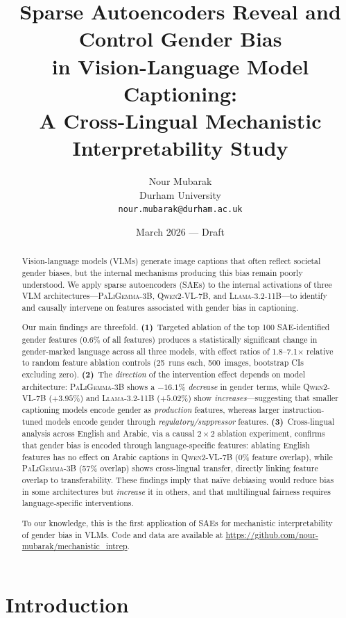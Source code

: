 \documentclass[11pt,a4paper]{article}
\title{Sparse Autoencoders Reveal and Control Gender Bias\\in Vision-Language Model Captioning:\\A Cross-Lingual Mechanistic Interpretability Study}
\author{
  Nour Mubarak \\
  Durham University \\
  \texttt{nour.mubarak@durham.ac.uk}
}
\date{March 2026 — Draft}
\newcommand{\modelname}[1]{\textsc{#1}}
\newcommand{\pali}{\modelname{PaLiGemma-3B}}
\newcommand{\qwen}{\modelname{Qwen2-VL-7B}}
\newcommand{\llama}{\modelname{Llama-3.2-11B}}
\newcommand{\sae}{SAE}
\newcommand{\saes}{SAEs}
\begin{document}
\maketitle

\begin{abstract}
Vision-language models (VLMs) generate image captions that often reflect societal gender biases, but the internal mechanisms producing this bias remain poorly understood.
We apply sparse autoencoders (\saes{}) to the internal activations of three VLM architectures---\pali{}, \qwen{}, and \llama{}---to identify and causally intervene on features associated with gender bias in captioning.

Our main findings are threefold.
\textbf{(1)}~Targeted ablation of the top 100 \sae{}-identified gender features (0.6\% of all features) produces a statistically significant change in gender-marked language across all three models, with effect ratios of 1.8--7.1$\times$ relative to random feature ablation controls (25~runs each, 500~images, bootstrap CIs excluding zero).
\textbf{(2)}~The \emph{direction} of the intervention effect depends on model architecture: \pali{} shows a $-16.1\%$ \emph{decrease} in gender terms, while \qwen{} ($+3.95\%$) and \llama{} ($+5.02\%$) show \emph{increases}---suggesting that smaller captioning models encode gender as \emph{production} features, whereas larger instruction-tuned models encode gender through \emph{regulatory/suppressor} features.
\textbf{(3)}~Cross-lingual analysis across English and Arabic, via a causal $2\times 2$ ablation experiment, confirms that gender bias is encoded through language-specific features: ablating English features has no effect on Arabic captions in \qwen{} (0\% feature overlap), while \pali{} (57\% overlap) shows cross-lingual transfer, directly linking feature overlap to transferability.
These findings imply that na\"ive debiasing would reduce bias in some architectures but \emph{increase} it in others, and that multilingual fairness requires language-specific interventions.

To our knowledge, this is the first application of \saes{} for mechanistic interpretability of gender bias in VLMs.
Code and data are available at \url{https://github.com/nour-mubarak/mechanistic_intrep}.
\end{abstract}

\section{Introduction}
\label{sec:intro}
\end{document}
